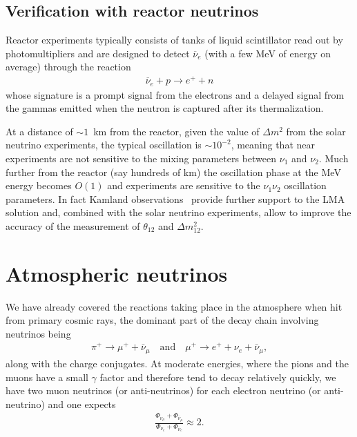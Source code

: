 \subsection{Verification with reactor neutrinos}

Reactor experiments typically consists of tanks of liquid scintillator read out by
photomultipliers and are designed to detect $\overline{\nu}_e$ (with a few MeV of energy on average) through the reaction
\begin{align*}
  \overline{\nu}_e + p \rightarrow e^+ + n
\end{align*}
whose signature is a prompt signal from the electrons and a delayed signal from
the gammas emitted when the neutron is captured after its thermalization.

At a distance of $\sim 1$~km from the reactor, given the value of $\Delta m^2$ from
the solar neutrino experiments, the typical oscillation is $\sim 10^{-2}$, meaning
that near experiments are not sensitive to the mixing parameters between $\nu_1$
and $\nu_2$.  Much further from the reactor (say hundreds of km) the oscillation phase
at the MeV energy becomes $O(1)$ and experiments are sensitive to the $\nu_1\nu_2$
oscillation parameters. In fact Kamland observations~\cite{2005PhRvL..94h1801A} provide
further support to the LMA solution and, combined with the solar neutrino experiments,
allow to improve the accuracy of the measurement of $\theta_{12}$ and $\Delta m^2_{12}$.


\section{Atmospheric neutrinos}
\label{sec:nu_atmospheric}

We have already covered the reactions taking place in the atmosphere when hit from
primary cosmic rays, the dominant part of the decay chain involving neutrinos being
\begin{align*}
  \pi^+ \rightarrow \mu^+ + \bar{\nu}_\mu
  \quad\text{and}\quad
  \mu^+ \rightarrow e^+ + \nu_e + \bar{\nu}_\mu,
\end{align*}
along with the charge conjugates. At moderate energies, where the pions and the
muons have a small $\gamma$ factor and therefore tend to decay relatively quickly,
we have two muon neutrinos (or anti-neutrinos) for each electron neutrino (or anti-neutrino)
and one expects
\begin{align*}
  \frac{\Phi_{\nu_\mu} + \Phi_{\bar{\nu}_\mu}}{\Phi_{\nu_e} + \Phi_{\bar{\nu}_e}} \approx 2.
\end{align*}

